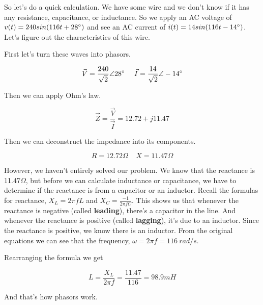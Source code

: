 \documentclass[12pt]{extarticle}
\begin{document}
So let's do a quick calculation. We have some wire and we don't know if it has any resistance, capacitance, or inductance. So we apply an AC voltage of $v(t) = 240 sin(116t + 28 \degree)$ and see an AC current of $i(t) = 14 sin (116t-14 \degree)$. Let's figure out the characteristics of this wire.

First let's turn these waves into phasors.

$$\vec{V} = \frac{240}{\sqrt{2}} \angle 28 \degree \ \ \ \ \vec{I} = \frac{14}{\sqrt{2}} \angle -14 \degree$$

Then we can apply Ohm's law.

$$\vec{Z} = \frac{\vec{V}}{\vec{I}} = 12.72 + j11.47 $$

Then we can deconstruct the impedance into its components.

$$R = 12.72\Omega \ \ \ \ \ X = 11.47\Omega$$

However, we haven't entirely solved our problem. We know that the reactance is 11.47$\Omega$, but before we can calculate inductance or capacitance, we have to determine if the reactance is from a capacitor or an inductor. Recall the formulas for reactance, $ X_L = 2 \pi f L$ and $X_C = \frac{-1}{2\pi f C}$. This shows us that whenever the reactance is negative (called \textbf{leading}), there's a capacitor in the line. And whenever the reactance is positive (called \textbf{lagging}), it's due to an inductor. Since the reactance is positive, we know there is an inductor. From the original equations we can see that the frequency, $\omega = 2\pi f = 116\ rad/s$.

Rearranging the formula we get

$$L = \frac{X_L}{2 \pi f} = \frac{11.47}{116} = 98.9mH $$

And that's how phasors work.


\clearpage
\doublespacing


\end{document}
